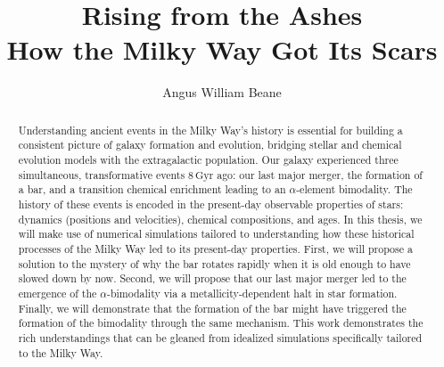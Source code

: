 \documentclass[11pt]{gsasthesis} %
\title{Rising from the Ashes\\How the Milky Way Got Its Scars} %
\author{Angus William Beane} %
\newcommand{\Gyr}{\ensuremath{\textrm{Gyr}}}
\begin{document}




\thesistitlepage
\copyrightpage
\begin{abstract}
  Understanding ancient events in the Milky Way's history is essential for building a consistent picture of galaxy formation and evolution, bridging stellar and chemical evolution models with the extragalactic population. Our galaxy experienced three simultaneous, transformative events $8\,\Gyr$ ago: our last major merger, the formation of a bar, and a transition chemical enrichment leading to an $\alpha$-element bimodality. The history of these events is encoded in the present-day observable properties of stars: dynamics (positions and velocities), chemical compositions, and ages. In this thesis, we will make use of numerical simulations tailored to understanding how these historical processes of the Milky Way led to its present-day properties. First, we will propose a solution to the mystery of why the bar rotates rapidly when it is old enough to have slowed down by now. Second, we will propose that our last major merger led to the emergence of the $\alpha$-bimodality via a metallicity-dependent halt in star formation. Finally, we will demonstrate that the formation of the bar might have triggered the formation of the bimodality through the same mechanism. This work demonstrates the rich understandings that can be gleaned from idealized simulations specifically tailored to the Milky Way.
\end{abstract}

\renewcommand{\contentsname}{\protect\centering\protect\Large Table of Contents}
\renewcommand{\listtablename}{\protect\centering\protect\Large List of Tables}
\renewcommand{\listfigurename}{\protect\centering\protect\Large List of Figures}
\end{document}
